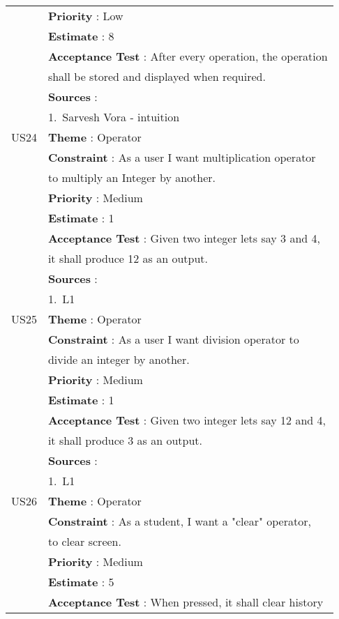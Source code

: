 \documentclass{article}
\begin{document}
\begin{longtable}{|| c || l ||}
         & \textbf{Priority} : Low \\
         & \textbf{Estimate} : 8 \\
         & \textbf{Acceptance Test} : After every operation, the operation \\
         & shall be stored and displayed when required.\\
         & \textbf{Sources} : \\
         & 1.~Sarvesh Vora - intuition \\
         \hline
         US24 & \textbf{Theme} : Operator \\
         & \textbf{Constraint} : As a user I want multiplication operator \\
         & to multiply an Integer by another.\\
         & \textbf{Priority} : Medium \\
         & \textbf{Estimate} : 1 \\
         & \textbf{Acceptance Test} : Given two integer lets say 3 and 4, \\
         & it shall produce 12 as an output.\\
         & \textbf{Sources} : \\
         & 1.~L1 \\
         \hline
         US25 & \textbf{Theme} : Operator \\
         & \textbf{Constraint} : As a user I want division operator to \\
         & divide an integer by another.\\
         & \textbf{Priority} : Medium \\
         & \textbf{Estimate} : 1 \\
         & \textbf{Acceptance Test} : Given two integer lets say 12 and 4,\\
         & it shall produce 3 as an output.\\
         & \textbf{Sources} : \\
         & 1.~L1 \\
         \hline
         \newpage
         \hline
         US26 & \textbf{Theme} : Operator \\
         & \textbf{Constraint} : As a student, I want a "clear" operator,\\
         & to clear screen.\\
         & \textbf{Priority} : Medium \\
         & \textbf{Estimate} : 5 \\
         & \textbf{Acceptance Test} : When pressed, it shall clear history\\

\end{longtable}
\end{document}
